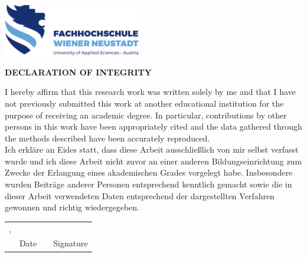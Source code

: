 
\includegraphics[width=6cm]{images/fhwn-logo-neu-ohneSchutzraum.png}

\vspace{100pt}

\begin{center}
	{\noindent\fontsize{18pt}{21.6pt}\color{header-blue}\textbf{\sffamily DECLARATION OF INTEGRITY}}
\end{center}

\vspace{30pt}

\begin{sffamily}
	\noindent
	I hereby affirm that this research work was written solely by me and that I have not previously submitted this work at another educational institution for the purpose of receiving an academic degree. In particular, contributions by other persons in this work have been appropriately cited and the data gathered through the methods described have been accurately reproduced.
	\\

	\noindent
	Ich erkläre an Eides statt, dass diese Arbeit ausschließlich von mir selbst verfasst wurde und ich diese Arbeit nicht zuvor an einer anderen Bildungseinrichtung zum Zwecke der Erlangung eines akademischen Grades vorgelegt habe. Insbesondere wurden Beiträge anderer Personen entsprechend kenntlich gemacht sowie die in dieser Arbeit verwendeten Daten entsprechend der dargestellten Verfahren gewonnen und richtig wiedergegeben.

	\vspace{130pt}

	\begin{center}
		\begin{tabular}{p{3.8cm} >{\centering}p{3cm} p{.9cm} >{\centering}p{6cm}}
			\place, & \thesisdate & \hspace{0.1cm}             %
			\\ \cline{2-2} \cline{4-4}
			        & Date        &                & Signature \\
		\end{tabular}
	\end{center}
\end{sffamily}
\clearpage
